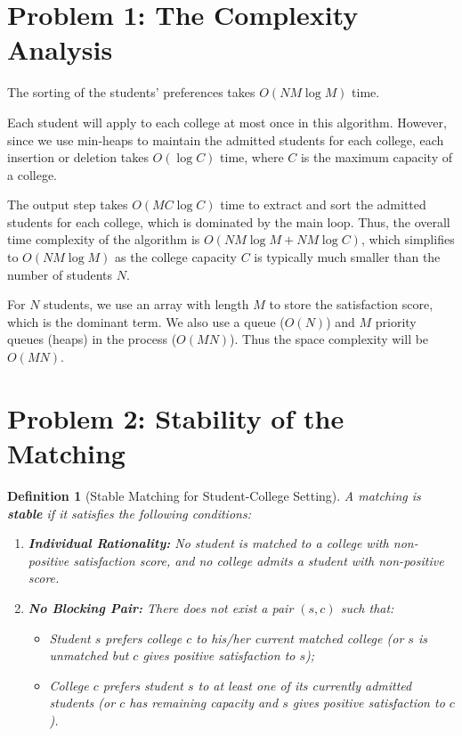 \documentclass[a4paper, UTF-8]{article}
\theoremstyle{plain}
\newtheorem{definition}{\indent Definition}[section]
\begin{document}
\section{Problem 1: The Complexity Analysis}

The sorting of the students' preferences takes $O(NM \log M)$ time. 

Each student will apply to each college at most once in this algorithm. However, since we use min-heaps to maintain the admitted students for each college, each insertion or deletion takes $O(\log C)$ time, where $C$ is the maximum capacity of a college. 

The output step takes $O(MC \log C)$ time to extract and sort the admitted students for each college, which is dominated by the main loop. Thus, the overall time complexity of the algorithm is $O(NM \log M + NM \log C)$, which simplifies to $O(NM \log M)$ as the college capacity $C$ is typically much smaller than the number of students $N$.

For $N$ students, we use an array with length $M$ to store the satisfaction score, which is the dominant term. We also use a queue ($O(N)$) and $M$ priority queues (heaps) in the process ($O(MN)$). Thus the space complexity will be $O(MN)$.

\section{Problem 2: Stability of the Matching}

\begin{definition}[Stable Matching for Student-College Setting]
    A matching is \textbf{stable} if it satisfies the following conditions:
    \begin{enumerate}
        \item \textbf{Individual Rationality:} No student is matched to a college with non-positive satisfaction score, and no college admits a student with non-positive score.
        \item \textbf{No Blocking Pair:} There does not exist a pair $(s, c)$ such that:
        \begin{itemize}
            \item Student $s$ prefers college $c$ to his/her current matched college (or $s$ is unmatched but $c$ gives positive satisfaction to $s$);
            \item College $c$ prefers student $s$ to at least one of its currently admitted students (or $c$ has remaining capacity and $s$ gives positive satisfaction to $c$).
        \end{itemize}
    \end{enumerate}
\end{definition}
\end{document}
